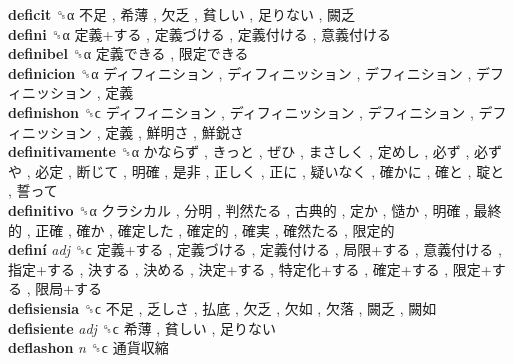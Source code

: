 \textbf{deficit} ␝α   不足 ,  希薄 ,  欠乏 ,  貧しい ,  足りない ,  闕乏   \\
\textbf{defini} ␝α   定義+する ,  定義づける ,  定義付ける ,  意義付ける   \\
\textbf{definibel} ␝α   定義できる ,  限定できる   \\
\textbf{definicion} ␝α   ディフィニション ,  ディフィニッション ,  デフィニション ,  デフィニッション ,  定義   \\
\textbf{definishon} ␝ϲ   ディフィニション ,  ディフィニッション ,  デフィニション ,  デフィニッション ,  定義 ,  鮮明さ ,  鮮鋭さ   \\
\textbf{definitivamente} ␝α   かならず ,  きっと ,  ぜひ ,  まさしく ,  定めし ,  必ず ,  必ずや ,  必定 ,  断じて ,  明確 ,  是非 ,  正しく ,  正に ,  疑いなく ,  確かに ,  確と ,  聢と ,  誓って   \\
\textbf{definitivo} ␝α   クラシカル ,  分明 ,  判然たる ,  古典的 ,  定か ,  慥か ,  明確 ,  最終的 ,  正確 ,  確か ,  確定した ,  確定的 ,  確実 ,  確然たる ,  限定的   \\
\textbf{definí} \emph{adj}  ␝ϲ   定義+する ,  定義づける ,  定義付ける ,  局限+する ,  意義付ける ,  指定+する ,  決する ,  決める ,  決定+する ,  特定化+する ,  確定+する ,  限定+する ,  限局+する   \\
\textbf{defisiensia} ␝ϲ   不足 ,  乏しさ ,  払底 ,  欠乏 ,  欠如 ,  欠落 ,  闕乏 ,  闕如   \\
\textbf{defisiente} \emph{adj}  ␝ϲ   希薄 ,  貧しい ,  足りない   \\
\textbf{deflashon} \emph{n}  ␝ϲ   通貨収縮   \\
